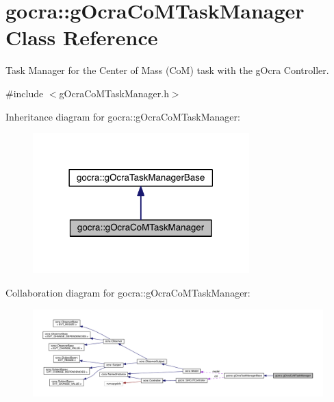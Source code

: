 \hypertarget{classgocra_1_1gOcraCoMTaskManager}{}\section{gocra\+:\+:g\+Ocra\+Co\+M\+Task\+Manager Class Reference}
\label{classgocra_1_1gOcraCoMTaskManager}


Task Manager for the Center of Mass (CoM) task with the g\+Ocra Controller.  




{\ttfamily \#include $<$g\+Ocra\+Co\+M\+Task\+Manager.\+h$>$}



Inheritance diagram for gocra\+:\+:g\+Ocra\+Co\+M\+Task\+Manager\+:\nopagebreak
\begin{figure}[H]
\begin{center}
\leavevmode
\includegraphics[width=237pt]{df/d4a/classgocra_1_1gOcraCoMTaskManager__inherit__graph}
\end{center}
\end{figure}


Collaboration diagram for gocra\+:\+:g\+Ocra\+Co\+M\+Task\+Manager\+:
\nopagebreak
\begin{figure}[H]
\begin{center}
\leavevmode
\includegraphics[width=350pt]{da/db3/classgocra_1_1gOcraCoMTaskManager__coll__graph}
\end{center}
\end{figure}
